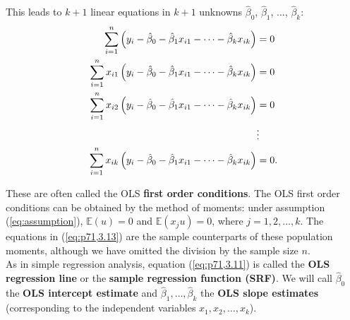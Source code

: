 \documentclass[a4paper, 10pt]{article}
\theoremstyle{definition}	%
\begin{document}
This leads to $k + 1$ linear equations in $k + 1$ unknowns $\hat{\beta}_0$, $\hat{\beta}_1$, $\ldots$, $\hat{\beta}_k$:
\begin{align}
    \sum_{i=1}^{n} \left( y_i - \hat{\beta}_0 - \hat{\beta}_1 x_{i1} - \cdots - \hat{\beta}_k x_{ik} \right) &= 0 \notag \\
    \sum_{i=1}^{n} x_{i1} \left( y_i - \hat{\beta}_0 - \hat{\beta}_1 x_{i1} - \cdots - \hat{\beta}_k x_{ik} \right) &= 0 \notag \\
    \sum_{i=1}^{n} x_{i2} \left( y_i - \hat{\beta}_0 - \hat{\beta}_1 x_{i1} - \cdots - \hat{\beta}_k x_{ik} \right) &= 0 \notag \\
    &\vdots \notag \\
    \sum_{i=1}^{n} x_{ik} \left( y_i - \hat{\beta}_0 - \hat{\beta}_1 x_{i1} - \cdots - \hat{\beta}_k x_{ik} \right) &= 0.
    \label{eq:p71,3.13}
\end{align}

These are often called the OLS \textbf{first order conditions}. The OLS first order conditions can be obtained by the method of moments: under assumption (\ref{eq:assumption}), $\mathbb{E}(u) = 0$ and $\mathbb{E}(x_j u) = 0$, where $j = 1, 2, \ldots, k$. The equations in (\ref{eq:p71,3.13}) are the sample counterparts of these population moments, although we have omitted the division by the sample size $n$.\\
As in simple regression analysis, equation (\ref{eq:p71,3.11}) is called the \textbf{OLS regression line} or the \textbf{sample regression function (SRF)}. We will call $\hat{\beta}_0$ the \textbf{OLS intercept estimate} and $\hat{\beta}_1, \ldots, \hat{\beta}_k$ the \textbf{OLS slope estimates} (corresponding to the independent variables $x_1, x_2, \ldots, x_k$).
\end{document}
